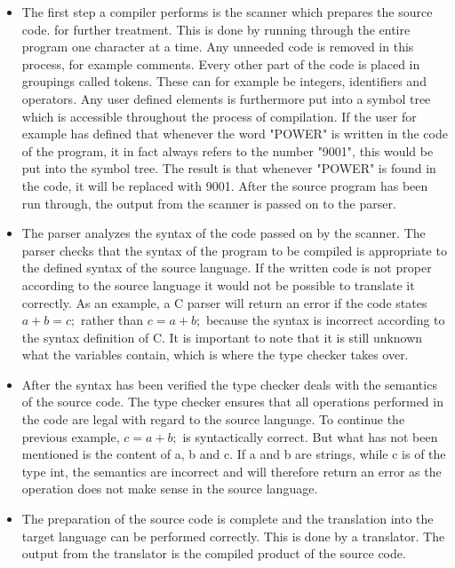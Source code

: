 \begin{itemize}
	\item The first step a compiler performs is the scanner which prepares the source code. for further treatment. This is done by running through the entire program one character at a time. Any unneeded code is removed in this process, for example comments.  Every other part of the code is placed in groupings called tokens. These can for example be integers, identifiers and operators. Any user defined elements is furthermore put into a symbol tree which is accessible throughout the process of compilation. If the user for example has defined that whenever the word "POWER" is written in the code of the program, it in fact always refers to the number "9001", this would be put into the symbol tree. The result is that whenever "POWER" is found in the code, it will be replaced with 9001. After the source program has been run through, the output from the scanner is passed on to the parser.
	
	\item The parser analyzes the syntax of the code passed on by the scanner. The parser checks that the syntax of the program to be compiled is appropriate to the defined syntax of the source language. If the written code is not proper according to the source language it would not be possible to translate it correctly. As an example, a C parser will return an error if the code states $a + b = c;$ rather than $c = a + b;$ because the syntax is incorrect according to the syntax definition of C. It is important to note that it is still unknown what the variables contain, which is where the type checker takes over.

	\item After the syntax has been verified the type checker deals with the semantics of the source code. The type checker ensures that all operations performed in the code are legal with regard to the source language. To continue the previous example, $c = a + b;$ is syntactically correct. But what has not been mentioned is the content of a, b and c. If a and b are strings, while c is of the type int, the semantics are incorrect and will therefore return an error as the operation does not make sense in the source language.

	\item The preparation of the source code is complete and the translation into the target language can be performed correctly. This is done by a translator. The output from the translator is the compiled product of the source code.
\end{itemize}

